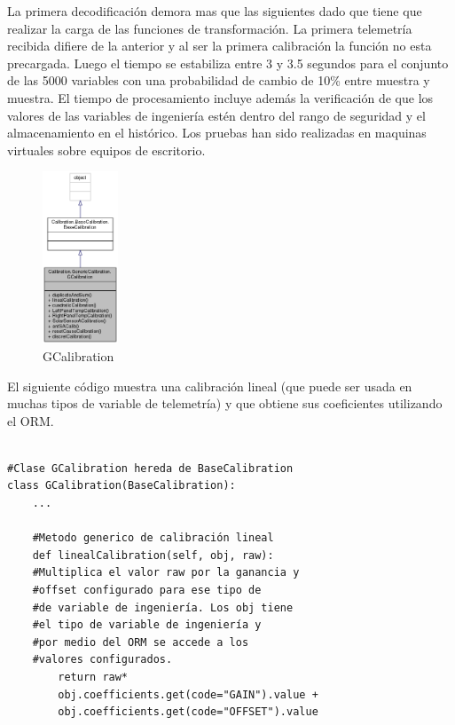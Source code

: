 \documentclass[twoside,twocolumn]{article}
\begin{document}
La primera decodificación demora mas que las siguientes dado que tiene que realizar la carga de las funciones de transformación. La primera telemetría recibida difiere de la anterior y al ser la primera calibración la función no esta precargada.  Luego el tiempo se estabiliza entre 3 y 3.5 segundos para el conjunto de las 5000 variables con una probabilidad de cambio de 10\% entre muestra y muestra. El tiempo de procesamiento incluye además la verificación de que los valores de las variables de ingeniería estén dentro del rango de seguridad y el almacenamiento en el histórico. Los pruebas han sido realizadas en maquinas virtuales sobre equipos de escritorio.






\begin{figure}[]
  \caption{GCalibration}
  \label{fig:GCalibration}
  \centering
  \includegraphics[width=0.2\textwidth]{Imagenes/GenericCalibration.png}
\end{figure}


El siguiente código muestra una calibración lineal (que puede ser usada en muchas tipos de variable de telemetría) y que obtiene sus coeficientes utilizando el ORM.

\begin{verbatim}

#Clase GCalibration hereda de BaseCalibration
class GCalibration(BaseCalibration):
    ...
  
    #Metodo generico de calibración lineal
    def linealCalibration(self, obj, raw):
	#Multiplica el valor raw por la ganancia y 
	#offset configurado para ese tipo de
	#de variable de ingeniería. Los obj tiene 
	#el tipo de variable de ingeniería y
	#por medio del ORM se accede a los 
	#valores configurados.
        return raw*
	    obj.coefficients.get(code="GAIN").value + 
	    obj.coefficients.get(code="OFFSET").value

\end{verbatim}
\end{document}

